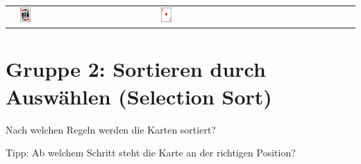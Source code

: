 \begin{tabular}{m{30mm}m{11mm}m{11mm}m{11mm}m{11mm}m{11mm}m{11mm}m{11mm}m{11mm}}
&
\includegraphics[width=0.08\textwidth]{./inf/SEKII/19_Java_Sortierverfahren/HerzKoenig.png}
&
\includegraphics[width=0.08\textwidth]{./inf/SEKII/19_Java_Sortierverfahren/HerzAs.png}
\\
\end{tabular}

\clearpage


\section{Gruppe 2: Sortieren durch Auswählen (Selection Sort)}

Nach welchen Regeln werden die Karten sortiert?

Tipp: Ab welchem Schritt steht die Karte an der richtigen Position?

